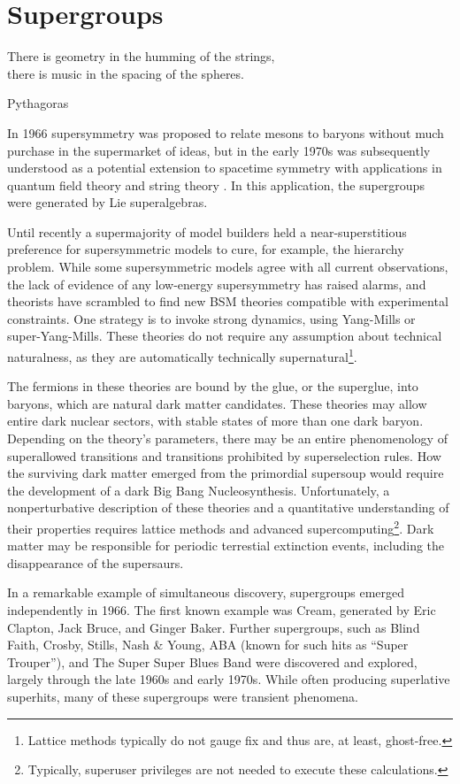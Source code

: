 \section{Supergroups}

\epigraph{There is geometry in the humming of the strings,\\
there is music in the spacing of the spheres.}{Pythagoras}


In 1966 supersymmetry was proposed to relate mesons to baryons\cite{doi:10.1143/PTP.36.1266} without much purchase in the supermarket of ideas, but in the early 1970s was subsequently understood as a potential extension to spacetime symmetry with applications in quantum field theory and string theory \cite{Gervais:1971ji,Ramond:1971gb,Volkov:1973ix,Wess:1974tw}.
In this application, the supergroups were generated by Lie superalgebras.

Until recently a supermajority of model builders held a near-superstitious preference for supersymmetric models to cure, for example, the hierarchy problem.
While some supersymmetric models agree with all current observations\cite{fox:2005}, the lack of evidence of any low-energy supersymmetry has raised alarms, and theorists have scrambled to find new BSM theories compatible with experimental constraints.
One strategy is to invoke strong dynamics, using Yang-Mills or super-Yang-Mills.
These theories do not require any assumption about technical naturalness, as they are automatically technically supernatural\footnote{Lattice methods typically do not gauge fix and thus are, at least, ghost-free.}.

The fermions in these theories are bound by the glue, or the superglue, into baryons, which are natural dark matter candidates.
These theories may allow entire dark nuclear sectors, with stable states of more than one dark baryon.
Depending on the theory's parameters, there may be an entire phenomenology of superallowed transitions and transitions prohibited by superselection rules.
How the surviving dark matter emerged from the primordial supersoup would require the development of a dark Big Bang Nucleosynthesis.
Unfortunately, a nonperturbative description of these theories and a quantitative understanding of their properties requires lattice methods and advanced supercomputing\cite{Detmold:2014qqa,Detmold:2014kba}\footnote{Typically, superuser privileges are not needed to execute these calculations.}.
Dark matter may be responsible for periodic terrestial extinction events, including the disappearance of the supersaurs\cite{Randall:2014lxa}.

In a remarkable example of simultaneous discovery, supergroups emerged independently in 1966.
The first known example was Cream, generated by Eric Clapton, Jack Bruce, and Ginger Baker\cite{supergroups}.
Further supergroups, such as Blind Faith, Crosby, Stills, Nash \& Young, ABA (known for such hits as ``Super Trouper''), and The Super Super Blues Band\cite{supersuperblues} were discovered and explored, largely through the late 1960s and early 1970s.
While often producing superlative superhits, many of these supergroups were transient phenomena.
